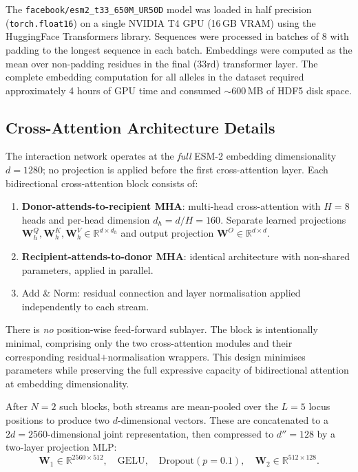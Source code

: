 \documentclass[12pt]{article}
\begin{document}
The \texttt{facebook/esm2\_t33\_650M\_UR50D} model was loaded in half
precision (\texttt{torch.float16}) on a single NVIDIA T4 GPU (16\,GB VRAM)
using the HuggingFace Transformers library.  Sequences were processed in
batches of 8 with padding to the longest sequence in each batch.  Embeddings
were computed as the mean over non-padding residues in the final (33rd)
transformer layer.  The complete embedding computation for all alleles in the
dataset required approximately 4 hours of GPU time and consumed $\sim$600\,MB
of HDF5 disk space.

\subsection{Cross-Attention Architecture Details}

The interaction network operates at the \emph{full} ESM-2 embedding
dimensionality $d = 1280$; no projection is applied before the first
cross-attention layer.  Each bidirectional cross-attention block consists of:
\begin{enumerate}
  \item \textbf{Donor-attends-to-recipient MHA}: multi-head cross-attention
        with $H = 8$ heads and per-head dimension $d_h = d/H = 160$.
        Separate learned projections
        $\mathbf{W}^Q_h, \mathbf{W}^K_h, \mathbf{W}^V_h \in \mathbb{R}^{d \times d_h}$
        and output projection $\mathbf{W}^O \in \mathbb{R}^{d \times d}$.
  \item \textbf{Recipient-attends-to-donor MHA}: identical architecture with
        non-shared parameters, applied in parallel.
  \item Add \& Norm: residual connection and layer normalisation
        \citep{ba2016layernorm} applied independently to each stream.
\end{enumerate}
There is \emph{no} position-wise feed-forward sublayer.  The block is
intentionally minimal, comprising only the two cross-attention modules and
their corresponding residual$+$normalisation wrappers.  This design
minimises parameters while preserving the full expressive capacity of
bidirectional attention at embedding dimensionality.

After $N = 2$ such blocks, both streams are mean-pooled over the $L = 5$
locus positions to produce two $d$-dimensional vectors.  These are
concatenated to a $2d = 2560$-dimensional joint representation, then
compressed to $d'' = 128$ by a two-layer projection MLP:
\begin{equation}
  \mathbf{W}_1 \in \mathbb{R}^{2560 \times 512},\quad
  \text{GELU},\quad
  \text{Dropout}(p = 0.1),\quad
  \mathbf{W}_2 \in \mathbb{R}^{512 \times 128}.
\end{equation}
\end{document}
